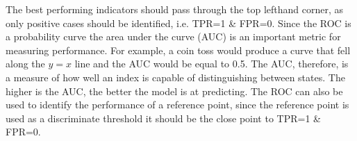 The best performing indicators should pass through the top lefthand corner, as only positive cases should be identified, i.e. TPR=1 \& FPR=0. Since the ROC is a probability curve the area under the curve (AUC) is an important metric for measuring performance. For example, a coin toss would produce a curve that fell along the $y=x$ line and the AUC would be equal to 0.5. The AUC, therefore, is a measure of how well an index is capable of distinguishing between states. The higher is the AUC, the better the model is at predicting. The ROC can also be used to identify the performance of a reference point, since the reference point is used as a discriminate threshold it should be the close point to TPR=1 \& FPR=0.



